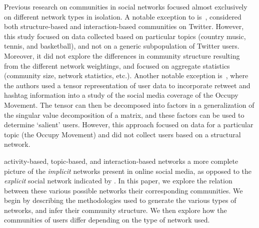 Previous research on communities in social networks focused almost exclusively on different network types in isolation.
A notable exception to \DIFdelbegin {}\DIFdelend \DIFaddbegin {}\DIFaddend is~\cite{lim2012tweets}, \DIFdelbegin {}\DIFdelend \DIFaddbegin {}\DIFaddend considered both structure-based and interaction-based communities on Twitter. However, this study focused on data collected based on particular topics (country music, tennis, and basketball), and not on a generic subpopulation of Twitter users. Moreover, it did not explore the differences in community structure resulting from the different network weightings, and focused on aggregate statistics (community size, network statistics, etc.). Another notable exception is~\cite{kao2013talison}, where the authors used a tensor representation of user data to incorporate retweet and hashtag information into a study of the social media coverage of the Occupy Movement. The tensor can then be decomposed into factors in a generalization of the singular value decomposition of a matrix, and these factors can be used to determine `salient' users. However, \DIFaddbegin {}\DIFaddend this approach focused on data for a particular topic (the Occupy Movement) and did not collect users based on a structural network.

\DIFdelbegin {}\DIFdelend \DIFaddbegin {}\DIFaddend activity-based, topic-based, and interaction-based networks \DIFdelbegin {}\DIFdelend \DIFaddbegin {}\DIFaddend a more complete picture of the \emph{implicit} networks present in online social media, as opposed to the \emph{explicit} social network indicated by \DIFdelbegin {}\DIFdelend \DIFaddbegin {}\DIFaddend . In this paper, we explore the relation between these various possible networks \DIFdelbegin {}\DIFdelend \DIFaddbegin {}\DIFaddend their corresponding communities. We begin by describing the methodologies used to generate the various types of networks, and infer their community structure.  We then explore how the communities of users differ depending on the type of network used.
\DIFdelbegin {}%

